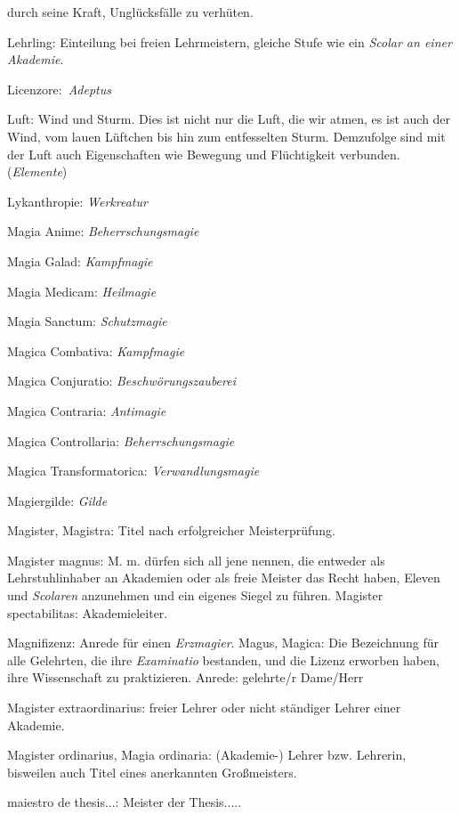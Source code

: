 \documentclass[a5paper,8pt]{book}
\begin{document}
\begin{small}
\begin{description}
durch seine Kraft, Unglücksfälle zu verhüten.
 \item Lehrling: Einteilung bei freien Lehrmeistern, gleiche Stufe wie ein \textit{Scolar an einer Akademie}.
 \item Licenzore: \textit{Adeptus}
 \item Luft: Wind und Sturm. Dies ist nicht nur die Luft, die wir atmen, es ist auch der Wind, vom lauen Lüftchen bis hin zum entfesselten Sturm. Demzufolge sind mit der 
Luft auch Eigenschaften wie Bewegung und Flüchtigkeit verbunden. (\textit{Elemente})
 \item Lykanthropie: \textit{Werkreatur}
 \item Magia Anime: \textit{Beherrschungsmagie}
 \item Magia Galad: \textit{Kampfmagie}
 \item Magia Medicam: \textit{Heilmagie}
 \item Magia Sanctum: \textit{Schutzmagie}
 \item Magica Combativa: \textit{Kampfmagie}
 \item Magica Conjuratio: \textit{Beschwörungszauberei}
 \item Magica Contraria: \textit{Antimagie}
 \item Magica Controllaria: \textit{Beherrschungsmagie}
 \item Magica Transformatorica: \textit{Verwandlungsmagie}
 \item Magiergilde: \textit{Gilde}
 \item Magister, Magistra: Titel nach erfolgreicher Meisterprüfung.
 \item Magister magnus: M. m. dürfen sich all jene nennen, die entweder als Lehrstuhlinhaber an Akademien oder als freie Meister das Recht haben, Eleven und 
\textit{Scolaren} anzunehmen und ein eigenes Siegel zu führen.
Magister spectabilitas: Akademieleiter.
 \item Magnifizenz: Anrede für einen \textit{Erzmagier}.
Magus, Magica: Die Bezeichnung für alle Gelehrten, die ihre \textit{Examinatio} bestanden, und die Lizenz erworben haben, ihre Wissenschaft zu praktizieren. Anrede:
gelehrte/r Dame/­Herr
 \item Magister extraordinarius: freier Lehrer oder nicht ständiger Lehrer einer Akademie.
 \item Magister ordinarius, Magia ordinaria: (Akademie-) Lehrer bzw. Lehrerin, bisweilen auch Titel eines an­erkan­nten Großmeisters.
 \item maiestro de thesis...: Meister der Thesis.....

\end{description}
\end{small}
\end{document}
